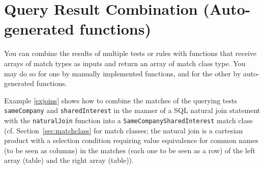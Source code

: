 \section{Query Result Combination (Auto-generated functions)}

You can combine the results of multiple tests or rules with functions that receive arrays of match types as inputs and return an array of match class type.
You may do so for one by manually implemented functions, and for the other by auto-generated functions.

Example \ref{exjoins} shows how to combine the matches of the querying tests \texttt{sameCompany} and \texttt{sharedInterest} in the manner of a SQL natural join statement with the \texttt{naturalJoin} function into a \texttt{SameCompanySharedInterest} match class (cf. Section~\ref{sec:matchclass} for match classes; the natural join is a cartesian product with a selection condition requiring value equivalence for common names (to be seen as columns) in the matches (each one to be seen as a row) of the left array (table) and the right array (table)).


